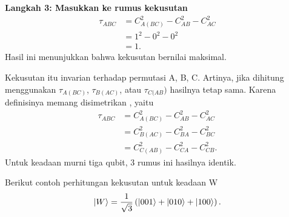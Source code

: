 \textbf{Langkah 3: Masukkan ke rumus kekusutan}
\begin{equation}
	\begin{aligned}
		\tau_{ABC} 
		&= C^2_{A(BC)} - C^2_{AB} - C^2_{AC}\\
		&= 1^2 - 0^2 - 0^2 \\
		&= 1.
	\end{aligned}
\end{equation}
Hasil ini menunjukkan bahwa kekusutan bernilai maksimal.
\par
Kekusutan itu invarian terhadap permutasi A, B, C. Artinya, jika dihitung menggunakan $\tau_{A(BC)}$, $\tau_{B(AC)}$, atau $\tau_{C(AB})$ hasilnya tetap sama. Karena definisinya memang disimetrikan \cite{coffman2000distributed}, yaitu
\begin{equation}
	\begin{aligned}
		\tau_{ABC} 
		&= C^2_{A(BC)} - C^2_{AB} - C^2_{AC}\\
		&= C^2_{B(AC)} - C^2_{BA} - C^2_{BC}\\
		&= C^2_{C(AB)} - C^2_{CA} - C^2_{CB}.
	\end{aligned}
\end{equation}
Untuk keadaan murni tiga qubit, 3 rumus ini hasilnya identik.
\par
Berikut contoh perhitungan kekusutan untuk keadaan W
\begin{equation*}
	\ket{W}=\frac{1}{\sqrt{3}}
	\left(\ket{001}+\ket{010}+\ket{100}\right).
\end{equation*}

